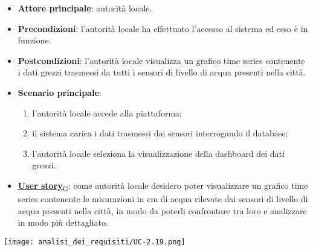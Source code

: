 \begin{itemize}
	\item \textbf{Attore principale}: autorità locale.
	\item \textbf{Precondizioni}: l'autorità locale ha effettuato l'accesso al sistema ed esso è in funzione.
	\item \textbf{Postcondizioni}: l'autorità locale visualizza un grafico time series contenente i dati grezzi trasmessi da tutti i sensori
	      di livello di acqua presenti nella città.
	\item \textbf{Scenario principale}:
	      \begin{enumerate}
		      \item l'autorità locale accede alla piattaforma;
		      \item il sistema carica i dati trasmessi dai sensori interrogando il database;
		      \item l'autorità locale seleziona la visualizzazione della dashboard dei dati grezzi.
	      \end{enumerate}
	\item \href{https://7last.github.io/docs/pb/documentazione-interna/glossario\#user-story}{\textbf{User story}\textsubscript{G}}:
	      come autorità locale desidero poter visualizzare un grafico time series contenente le misurazioni in cm di acqua rilevate dai sensori
	      di livello di acqua presenti nella città, in modo da poterli confrontare tra loro e analizzare in modo più dettagliato.
\end{itemize}
\begin{center}
	\texttt{[image: analisi\_dei\_requisiti/UC-2.19.png]}
\end{center}


